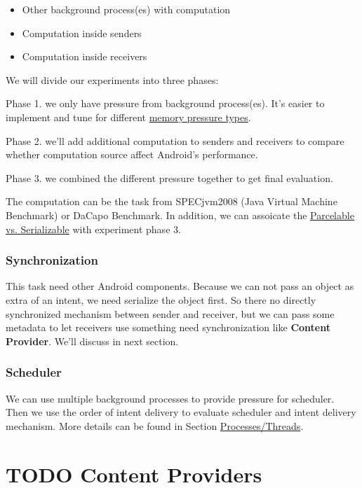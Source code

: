 \documentclass[11pt]{article}
\begin{document}
\begin{itemize}
\item Other background process(es) with computation
\item Computation inside senders
\item Computation inside receivers
\end{itemize}

We will divide our experiments into three phases:

Phase 1. we only have pressure from background process(es).
It's easier to implement and tune for different \hyperref[Memory-Pressure-Types]{memory pressure types}.

Phase 2. we'll add additional computation to senders and receivers to compare
whether computation source affect Android's performance.

Phase 3. we combined the different pressure together to get final evaluation.

The computation can be the task from SPECjvm2008 (Java Virtual Machine Benchmark) or DaCapo Benchmark.
In addition, we can assoicate the \hyperref[Parcelable/Serializable]{Parcelable vs. Serializable} with experiment phase 3.

\subsubsection{Synchronization}
\label{sec-3-2-2}
This task need other Android components.
Because we can not pass an object as extra of an intent, we need serialize the object first.
So there no directly synchronized mechanism between sender and receiver,
but we can pass some metadata to let receivers use something need synchronization like \textbf{Content Provider}. We'll discuss in next section.

\subsubsection{Scheduler}
\label{sec-3-2-3}
We can use multiple background processes to provide pressure for scheduler.
Then we use the order of intent delivery to evaluate scheduler and intent delivery mechanism. More details can be found in Section \hyperref[Processes/Threads]{Processes/Threads}.

\section{{\bfseries\sffamily TODO} Content Providers}
\label{sec-4}
\end{document}

